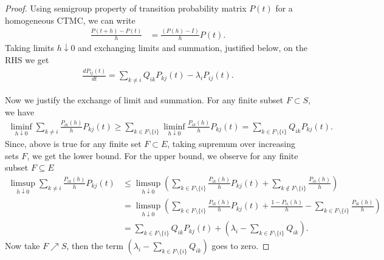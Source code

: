 \documentclass[all-lectures.tex]{subfiles}
\begin{document}
\begin{proof} 
	Using semigroup property of transition probability matrix $P(t)$ for a homogeneous CTMC,  
	we can write
	\begin{align*}
		\frac{P(t+h) - P(t)}{h} &= \frac{(P(h)- I)}{h}P(t). %
	\end{align*}
	Taking limits $h \downarrow 0$ and exchanging limits and summation, justified below, on the RHS we get 
	\begin{align*}
		\frac{dP_{ij}(t)}{dt} = \sum_{k \neq i}Q_{ik}P_{kj}(t)-\lambda_iP_{ij}(t). 
	\end{align*}
	
	
	Now we justify the exchange of limit and summation. For any finite subset $F \subset S$, we have
	\begin{align*}
		\liminf_{h \downarrow 0} \sum_{k \neq i}\frac{P_{ik}(h)}{h}P_{kj}(t) \geq \sum_{k \in F\setminus \{i\} }\liminf_{h \downarrow 0}\frac{P_{ik}(h)}{h}P_{kj}(t) = \sum_{k \in F\setminus \{i\}}Q_{ik}P_{kj}(t).
	\end{align*}
	Since, above is true for any finite set $F \subset E$, taking supremum over increasing sets $F$, we get the lower bound.
	For the upper bound, we observe for any finite subset $F \subseteq E$
	\begin{align*}
		\limsup_{h \downarrow 0}\sum_{k \neq i}\frac{P_{ik}(h)}{h}P_{kj}(t) &\leq \limsup_{h \downarrow 0}\left(\sum_{k \in F\setminus \{i\}}\frac{P_{ik}(h)}{h}P_{kj}(t)+\sum_{k \notin F\setminus\{i\} }\frac{P_{ik}(h)}{h}\right)\\
		& = \limsup_{h \downarrow 0}\left(\sum_{k \in F\setminus \{i\}}\frac{P_{ik}(h)}{h}P_{kj}(t)+\frac{1-P_{ii}(h)}{h} -\sum_{k \in F\setminus \{i\}}\frac{P_{ik}(h)}{h} \right)\\
		&= \sum_{k \in F\setminus \{i\}}Q_{ik}P_{kj}(t)+ \left(\lambda_i- \sum_{k \in F\setminus \{i\}}Q_{ik}\right). %
	\end{align*}
Now take $F \nearrow S$, then the term $\left(\lambda_i- \sum_{k \in F\setminus \{i\}}Q_{ik}\right)$ goes to zero.
	
\end{proof}
\end{document}
